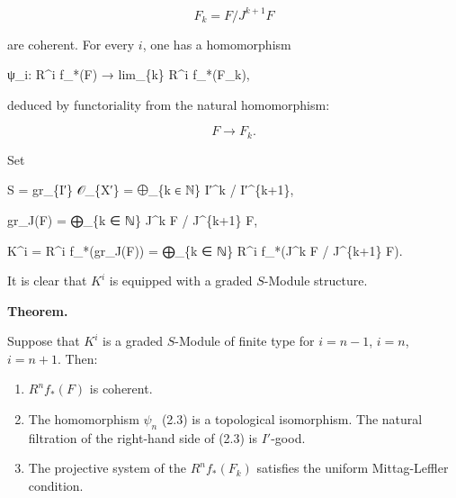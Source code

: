 \documentclass[
]{article}
\newenvironment{Shaded}{}{}
\newcommand{\NormalTok}[1]{#1}
\begin{document}
\[
F_{k} = F/J^{k+1} F
\]

are coherent. For every \(i\), one has a homomorphism

\begin{Shaded}
\begin{Highlighting}[]
\NormalTok{ψ\_i: R\^{}i f\_*(F) → lim\_\{k\} R\^{}i f\_*(F\_k),}
\end{Highlighting}
\end{Shaded}

deduced by functoriality from the natural homomorphism:

\[
F \to F_{k}.
\]

Set

\begin{Shaded}
\begin{Highlighting}[]
\NormalTok{S = gr\_\{I′\} 𝒪\_\{X′\} = ⨁\_\{k ∈ ℕ\} I′\^{}k / I′\^{}\{k+1\},}
\end{Highlighting}
\end{Shaded}

\begin{Shaded}
\begin{Highlighting}[]
\NormalTok{gr\_J(F) = ⨁\_\{k ∈ ℕ\} J\^{}k F / J\^{}\{k+1\} F,}
\end{Highlighting}
\end{Shaded}

\begin{Shaded}
\begin{Highlighting}[]
\NormalTok{K\^{}i = R\^{}i f\_*(gr\_J(F)) = ⨁\_\{k ∈ ℕ\} R\^{}i f\_*(J\^{}k F / J\^{}\{k+1\} F).}
\end{Highlighting}
\end{Shaded}

It is clear that \(K^{i}\) is equipped with a graded \(S\)-Module
structure.

\textbf{Theorem.}

Suppose that \(K^{i}\) is a graded \(S\)-Module of finite type for
\(i = n - 1\), \(i = n\), \(i = n + 1\). Then:

\begin{enumerate}
\def\labelenumi{(\roman{enumi})}
\item
  \(R^{n} f_{*}(F)\) is coherent.
\item
  The homomorphism \(\psi_{n}\) (2.3) is a topological isomorphism. The
  natural filtration of the right-hand side of (2.3) is \(I'\)-good.
\item
  The projective system of the \(R^{n} f_{*}(F_{k})\) satisfies the
  uniform Mittag-Leffler condition.
\end{enumerate}
\end{document}
